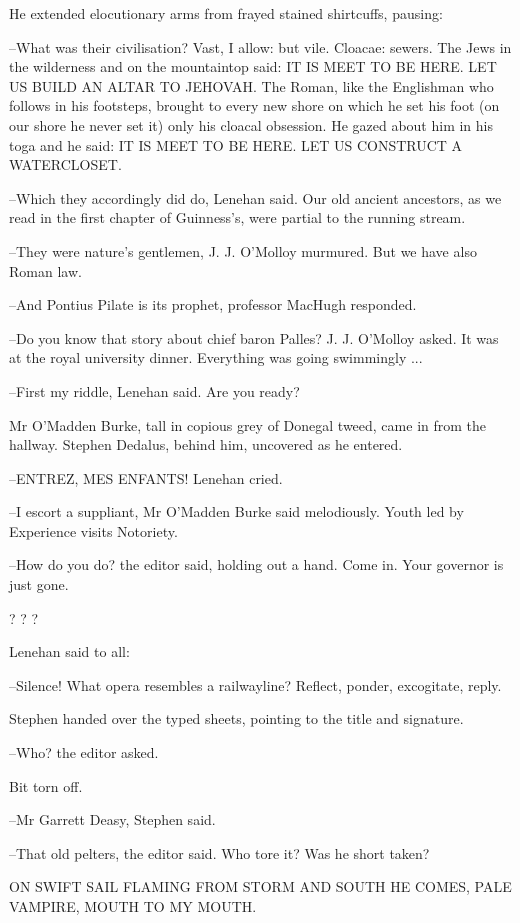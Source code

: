 He extended elocutionary arms from frayed stained shirtcuffs, pausing:

--What was their civilisation? Vast, I allow: but vile. Cloacae: sewers.
The Jews in the wilderness and on the mountaintop said: IT IS MEET TO BE
HERE. LET US BUILD AN ALTAR TO JEHOVAH. The Roman, like the Englishman who
follows in his footsteps, brought to every new shore on which he set his
foot (on our shore he never set it) only his cloacal obsession. He gazed
about him in his toga and he said: IT IS MEET TO BE HERE. LET US CONSTRUCT
A WATERCLOSET.

--Which they accordingly did do, Lenehan said. Our old ancient ancestors,
as we read in the first chapter of Guinness's, were partial to the running
stream.

--They were nature's gentlemen, J. J. O'Molloy murmured. But we have
also Roman law.

--And Pontius Pilate is its prophet, professor MacHugh responded.

--Do you know that story about chief baron Palles? J. J. O'Molloy asked.
It was at the royal university dinner. Everything was going
swimmingly ...

--First my riddle, Lenehan said. Are you ready?

Mr O'Madden Burke, tall in copious grey of Donegal tweed, came in
from the hallway. Stephen Dedalus, behind him, uncovered as he entered.

--ENTREZ, MES ENFANTS! Lenehan cried.

--I escort a suppliant, Mr O'Madden Burke said melodiously. Youth led by
Experience visits Notoriety.

--How do you do? the editor said, holding out a hand. Come in. Your
governor is just gone.


    ? ? ?


Lenehan said to all:

--Silence! What opera resembles a railwayline? Reflect, ponder,
excogitate, reply.

Stephen handed over the typed sheets, pointing to the title and signature.

--Who? the editor asked.

Bit torn off.

--Mr Garrett Deasy, Stephen said.

--That old pelters, the editor said. Who tore it? Was he short taken?


    ON SWIFT SAIL FLAMING
    FROM STORM AND SOUTH
    HE COMES, PALE VAMPIRE,
    MOUTH TO MY MOUTH.



